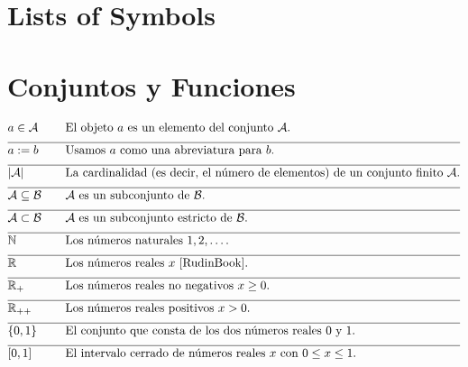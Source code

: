 
\section*{Lists of Symbols}

\vspace*{-2mm}
\section*{Conjuntos y Funciones} 

\begin{align} 
	&a \in \mathcal{A} & \quad & \parbox{.85\textwidth}{El objeto $a$ es un elemento del conjunto $\mathcal{A}$.} \nonumber \\[2mm] \hline \nonumber\\[-5mm]
	&a \defeq b & \quad & \mbox{Usamos $a$ como una abreviatura para $b$.} \nonumber \\[2mm] \hline \nonumber\\[-5mm]
	&|\mathcal{A}| & \quad & \mbox{La cardinalidad (es decir, el número de elementos) de un conjunto finito $\mathcal{A}$.} \nonumber \\[2mm] \hline \nonumber\\[-5mm]
	&\mathcal{A} \subseteq \mathcal{B}& \quad & \mbox{$\mathcal{A}$ es un subconjunto de $\mathcal{B}$.} \nonumber \\[2mm] \hline \nonumber\\[-5mm]
	&\mathcal{A} \subset \mathcal{B}& \quad & \mbox{$\mathcal{A}$ es un subconjunto estricto de $\mathcal{B}$.} \nonumber \\[2mm] \hline \nonumber\\[-5mm]
	&\mathbb{N} & \quad & \mbox{Los números naturales $1, 2, \dots$.} \nonumber \\[2mm] \hline \nonumber\\[-5mm]
	&\mathbb{R}  &\quad &\mbox{Los números reales $x$ \cite{RudinBook}.} \nonumber \\[2mm] \hline \nonumber\\[-5mm]
	&\mathbb{R}_{+}  &\quad &\mbox{Los números reales no negativos $x \geq 0$.} \nonumber \\[2mm] \hline \nonumber\\[-5mm]
	&\mathbb{R}_{++}  &\quad &\mbox{Los números reales positivos $x > 0$.} \nonumber \\[2mm] \hline \nonumber\\[-5mm]
	&\{0,1\}& \quad & \mbox{El conjunto que consta de los dos números reales $0$ y $1$.} \nonumber \\[2mm] \hline \nonumber\\[-5mm]
	&[0,1] &\quad &\mbox{El intervalo cerrado de números reales $x$ con $0 \leq x \leq 1$.}\nonumber 
\end{align} 

